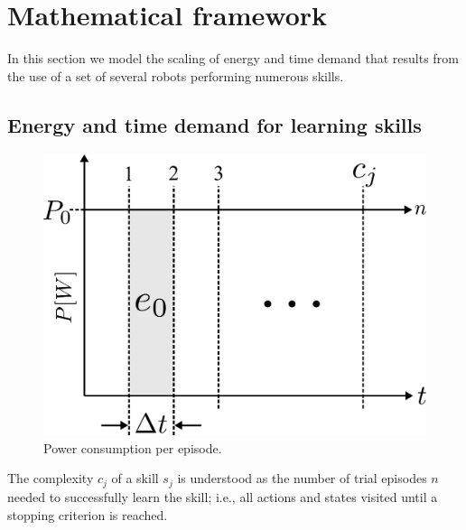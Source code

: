 \section{Mathematical framework}\label{sec:transfer_learning}
In this section we model the scaling of energy and time demand that results from the use of a set of several robots performing numerous skills.

\subsection{Energy and time demand for learning skills}
\begin{figure}[!ht]
	\centering
	\includegraphics[width=0.9\columnwidth]{fig/power_per_episode.pdf}
	\caption{Power consumption per episode.}
	\label{fig:power_per_episode}
\end{figure}
\begin{tcolorbox}
	\begin{definition}\label{definition:complexity}
		The complexity $c_j$ of a skill $ s_j $  is understood as the number of trial episodes $n$ needed to successfully learn the skill; i.e., all actions and states visited until a stopping criterion is reached. 
	\end{definition}
\end{tcolorbox}

